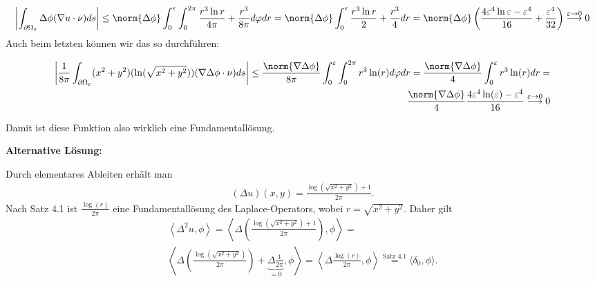 \begin{solution}
\begin{align*}
  \left|\int_{\partial \Omega_\varepsilon} \Delta \phi (\nabla u \cdot \nu) ds\right|
  \leq
  \norm{\Delta\phi}  \int_0^\varepsilon \int_0^{2 \pi} \frac{r^3\ln{r}}{4\pi} + \frac{r^3}{8\pi} d\varphi dr
  =
  \norm{\Delta\phi} \int_0^\varepsilon \frac{r^3\ln{r}}{2} + \frac{r^3}{4} dr
  =
  \norm{\Delta\phi}\left(\frac{4\varepsilon^4 \ln{\varepsilon} - \varepsilon^4}{16} + \frac{\varepsilon^4}{32}\right)
  \stackrel{\varepsilon \rightarrow 0}{\longrightarrow}
  0
\end{align*}
Auch beim letzten können wir das so durchführen:

\begin{align*}
  \left|\frac{1}{8\pi} \int_{\partial \Omega_\varepsilon} (x^2 + y^2)(\ln(\sqrt{x^2 + y^2})) (\nabla \Delta \phi \cdot \nu) ds\right|
  \leq
  \frac{\norm{\nabla \Delta \phi}}{8 \pi} \int_0^\varepsilon \int_0^{2 \pi} r^3 \ln(r) d\varphi dr
  =
  \frac{\norm{\nabla \Delta \phi}}{4} \int_0^\varepsilon r^3 \ln(r) dr
  =\\
  \frac{\norm{\nabla \Delta \phi}}{4} \frac{4 \varepsilon^4 \ln(\varepsilon) - \varepsilon^4 }{16}
  \stackrel{\varepsilon \rightarrow 0}{\longrightarrow}
  0
\end{align*}

Damit ist diese Funktion also wirklich eine Fundamentallösung.

\textbf{Alternative Lösung:}

Durch elementares Ableiten erhält man
\begin{align}
    (\Delta u)(x, y) = \frac{\log(\sqrt{x^2 + y^2}) + 1}{2 \pi}.
\end{align}
Nach Satz 4.1 ist $\frac{\log(r)}{2 \pi}$ eine Fundamentallösung des Laplace-Operators, wobei $r = \sqrt{x^2 + y^2}$. Daher gilt
\begin{align}
    \left\langle \Delta^2 u, \phi \right\rangle =  \left\langle \Delta \left( \frac{\log(\sqrt{x^2 + y^2}) + 1}{2 \pi}\right), \phi \right\rangle
    = \\ \left\langle \Delta \left( \frac{\log(\sqrt{x^2 + y^2})}{2 \pi}\right) + \underbrace{\Delta \frac{1}{2 \pi}}_{= 0}, \phi \right\rangle =
    \left\langle \Delta \frac{\log(r)}{2 \pi}, \phi \right\rangle \stackrel{\text{Satz 4.1}}= \langle \delta_0, \phi \rangle.
\end{align}
\end{solution}

